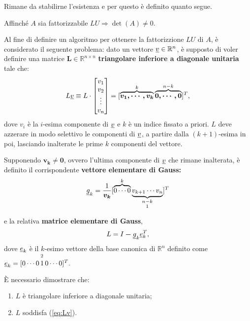 Rimane da stabilirne l'esistenza e per questo è definito quanto segue.

\begin{remark}
    Affinché $A$ sia fattorizzabile $LU\Rightarrow\det(A)\neq 0$.
\end{remark}

Al fine di definire un algoritmo per ottenere la fattorizzione $LU$ di $A$, è considerato il seguente problema: dato un vettore $\uline v\in\mathbb R^n$, è supposto di voler definire una matrice $\boldsymbol L\in\mathbb R^{n\times n}$ \textbf{triangolare inferiore a diagonale unitaria} tale che:
\begin{equation}\label{eq:Lv}
    L\uline v \equiv L\cdot \begin{bmatrix}
        v_1\\
        v_2\\
        \vdots\\
        v_n
    \end{bmatrix}=[\overbrace{\boldsymbol{v_1,\cdots, v_k}}^{k}\overbrace{\boldsymbol{0,\cdots, 0}}^{n-k}]^T,
\end{equation}
dove $v_i$ è la $i$-esima componente di $\uline v$ e $k$ è un indice fissato a priori. $L$ deve azzerare in modo selettivo le componenti di $\uline v$, a partire dalla $(k+1)$-esima in poi, lasciando inalterate le prime $k$ componenti del vettore.

Supponendo $\boldsymbol{v_k\neq 0}$, ovvero l'ultima componente di $\uline v$ che rimane inalterata, è definito il corrispondente \textbf{vettore elementare di Gauss:}
\begin{equation}\label{eq:vettElemGauss}
    \uline g_k=\frac{1}{\boldsymbol{v_k}}[\overbrace{0\cdots 0}^k \underbrace{v_{k+1}\cdots v_n}_{\underset{\footnotemark}{n-k}}]^T
\end{equation}
e la relativa \textbf{matrice elementare di Gauss},
\begin{equation}\label{eq:matrElemGauss}
    L=I\boldsymbol - \uline g_k \uline e_k^T,
\end{equation}
dove $\uline e_k$ è il $k$-esimo vettore della base canonica di $\mathbb R^n$ definito come $\uline e_k=[0\cdots 0\,\overset{\footnotemark}{1}\, 0 \cdots 0]^T.$ 

È necessario dimostrare che:
\begin{enumerate}
    \item $L$ è triangolare inferiore a diagonale unitaria;
    \item $L$ soddisfa (\ref{eq:Lv}).
\end{enumerate}

